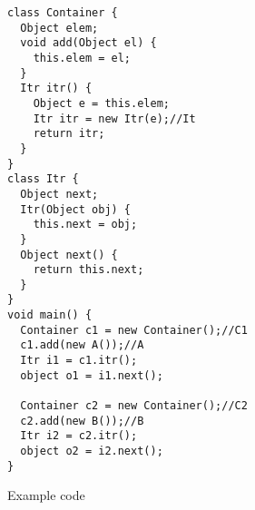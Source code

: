 

\begin{figure*}
\begin{center}
\begin{subfigure}[b]{1\columnwidth}
\centering
\begin{lstlisting}[multicols=2, xleftmargin=10pt]
class Container {
  Object elem;
  void add(Object el) {
    this.elem = el;
  }
  Itr itr() {
    Object e = this.elem;
    Itr itr = new Itr(e);//It
    return itr;
  }
}
class Itr {
  Object next;
  Itr(Object obj) {
    this.next = obj;
  }
  Object next() {
    return this.next;
  }
}
void main() {
  Container c1 = new Container();//C1
  c1.add(new A());//A
  Itr i1 = c1.itr();
  object o1 = i1.next();
	
  Container c2 = new Container();//C2
  c2.add(new B());//B
  Itr i2 = c2.itr();
  object o2 = i2.next();
}
\end{lstlisting}
\caption{Example code}
\label{fig:wrappedflow:code}
\end{subfigure}
\begin{multicols}{2}
	\begin{subfigure}[b]{\columnwidth}
	\centering
		\begin{center}
\end{center}
\end{subfigure}
\end{multicols}
\end{center}
\end{figure*}
